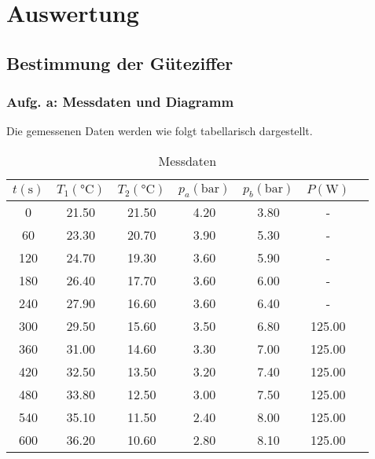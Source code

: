 \newpage
\section{Auswertung}
\label{sec:Auswertung}

\subsection{Bestimmung der Güteziffer}

\subsubsection{Aufg. a: Messdaten und Diagramm}

Die gemessenen Daten werden wie folgt tabellarisch dargestellt. 

\begin{table}
  \centering
  \caption{Messdaten}
  \label{tab:Messdaten}
  \begin{tabular}{c c c c c c c}  %
    \toprule
    {$t (\unit{\second})$} &
    {$T_{1} (\unit{\celsius})$}&
    {$T_{2} (\unit{\celsius})$}&
    {$p_{a} (\unit{\bar})$}&
    {$p_{b} (\unit{\bar})$}&
    {$P (\unit{\watt})$} \\
    \midrule
       0 &    21.50 &     21.50 &       4.20 &       3.80 &      - \\
      60 &    23.30 &     20.70 &       3.90 &       5.30 &      - \\
     120 &    24.70 &     19.30 &       3.60 &       5.90 &      - \\
     180 &    26.40 &     17.70 &       3.60 &       6.00 &      - \\
     240 &    27.90 &     16.60 &       3.60 &       6.40 &      - \\
     300 &    29.50 &     15.60 &       3.50 &       6.80 & 125.00 \\
     360 &    31.00 &     14.60 &       3.30 &       7.00 & 125.00 \\
     420 &    32.50 &     13.50 &       3.20 &       7.40 & 125.00 \\
     480 &    33.80 &     12.50 &       3.00 &       7.50 & 125.00 \\
     540 &    35.10 &     11.50 &       2.40 &       8.00 & 125.00 \\
     600 &    36.20 &     10.60 &       2.80 &       8.10 & 125.00 \\

\end{tabular}
\end{table}
